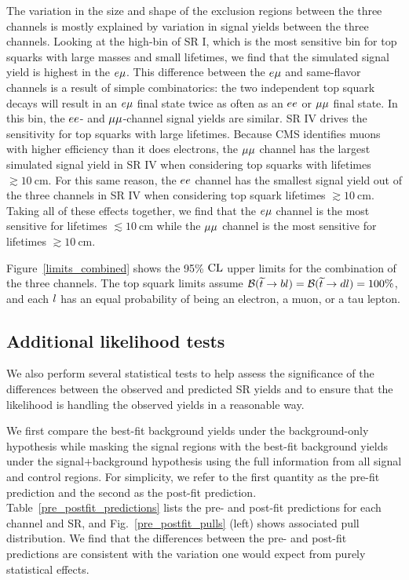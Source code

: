The variation in the size and shape of the exclusion regions between the three channels is mostly explained by variation in signal yields between the three channels. Looking at the high-\pt bin of SR I, which is the most sensitive bin for top squarks with large masses and small lifetimes, we find that the simulated signal yield is highest in the $e{\mu}$. This difference between the $e{\mu}$ and same-flavor channels is a result of simple combinatorics: the two independent top squark decays will result in an $e{\mu}$ final state twice as often as an $ee$ or ${\mu}{\mu}$ final state. In this bin, the $ee$- and ${\mu}{\mu}$-channel signal yields are similar. SR IV drives the sensitivity for top squarks with large lifetimes. Because CMS identifies muons with higher efficiency than it does electrons, the ${\mu}{\mu}$ channel has the largest simulated signal yield in SR IV when considering top squarks with lifetimes $\gtrsim\SI{10}{\cm}$. For this same reason, the $ee$ channel has the smallest signal yield out of the three channels in SR IV when considering top squark lifetimes $\gtrsim\SI{10}{\cm}$. Taking all of these effects together, we find that the $e{\mu}$ channel is the most sensitive for lifetimes ${\lesssim}\SI{10}{\cm}$ while the ${\mu}{\mu}$ channel is the most sensitive for lifetimes ${\gtrsim}\SI{10}{\cm}$.

Figure~\ref{limits_combined} shows the 95\% $\text{CL}$ upper limits for the combination of the three channels. The top squark limits assume $\mathcal{B}(\widetilde{t} \to b l)=\mathcal{B}(\widetilde{t} \to d l)=100\%$, and each $l$ has an equal probability of being an electron, a muon, or a tau lepton.



\subsection{Additional likelihood tests}
We also perform several statistical tests to help assess the significance of the differences between the observed and predicted SR yields and to ensure that the likelihood is handling the observed yields in a reasonable way.

We first compare the best-fit background yields under the background-only hypothesis while masking the signal regions with the best-fit background yields under the signal+background hypothesis using the full information from all signal and control regions. For simplicity, we refer to the first quantity as the pre-fit prediction and the second as the post-fit prediction. Table~\ref{pre_postfit_predictions} lists the pre- and post-fit predictions for each channel and SR, and Fig.~\ref{pre_postfit_pulls} (left) shows associated pull distribution. We find that the differences between the pre- and post-fit predictions are consistent with the variation one would expect from purely statistical effects.

